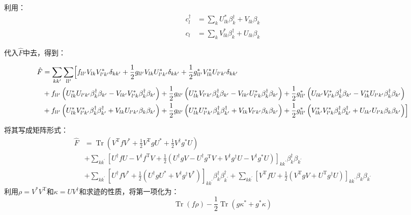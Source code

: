 \begin{booknote*}
利用：
\begin{align*}
c^{\dagger}_{l} & =\sum_{k}U^{*}_{lk}\beta^{\dagger}_{k}+V_{lk}\beta_{k}\\
c_{l} & =\sum_{k}V^{*}_{lk}\beta^{\dagger}_{k}+U_{lk}\beta_{k}
\end{align*}

代入$\hat{F}$中去，得到：

\begin{align*}
\hat{F} & =\sum_{kk^{\prime}}\sum_{ll^{\prime}}\Bigl[f_{ll^{\prime}}V_{lk}V^{*}_{l^{\prime}k^{\prime}}\delta_{kk^{\prime}}+\frac{1}{2}g_{ll^{\prime}}V_{lk}U^{*}_{l^{\prime}k^{\prime}}\delta_{kk^{\prime}}+\frac{1}{2}g^{*}_{ll^{\prime}}V^{*}_{lk}U_{l^{\prime}k^{\prime}}\delta_{kk^{\prime}}\\
 & +f_{ll^{\prime}}\left(U^{*}_{lk}U_{l^{\prime}k^{\prime}}\beta^{\dagger}_{k}\beta_{k^{\prime}}-V_{lk^{\prime}}V^{*}_{l^{\prime}k}\beta^{\dagger}_{k}\beta_{k^{\prime}}\right)+\frac{1}{2}g_{ll^{\prime}}\left(U^{*}_{lk}V_{l^{\prime}k^{\prime}}\beta^{\dagger}_{k}\beta_{k^{\prime}}-V_{lk^{\prime}}U^{*}_{l^{\prime}k}\beta^{\dagger}_{k}\beta_{k^{\prime}}\right)+\frac{1}{2}g^{*}_{ll^{\prime}}\left(U_{lk^{\prime}}V^{*}_{l^{\prime}k}\beta^{\dagger}_{k}\beta_{k^{\prime}}-V^{*}_{lk}U_{l^{\prime}k^{\prime}}\beta^{\dagger}_{k}\beta_{k^{\prime}}\right)\\
 & +f_{ll^{\prime}}\left(U^{*}_{lk}V^{*}_{l^{\prime}k^{\prime}}\beta^{\dagger}_{k}\beta^{\dagger}_{k^{\prime}}+V_{lk}U_{l^{\prime}k^{\prime}}\beta_{k}\beta_{k^{\prime}}\right)+\frac{1}{2}g_{ll^{\prime}}\left(U^{*}_{lk}U^{*}_{l^{\prime}k^{\prime}}\beta^{\dagger}_{k}\beta^{\dagger}_{k^{\prime}}+V_{lk}V_{l^{\prime}k^{\prime}}\beta_{k}\beta_{k^{\prime}}\right)+\frac{1}{2}g^{*}_{ll^{\prime}}\left(V^{*}_{lk^{\prime}}V^{*}_{l^{\prime}k}\beta^{\dagger}_{k}\beta^{\dagger}_{k^{\prime}}+U_{lk^{\prime}}U_{l^{\prime}k}\beta_{k}\beta_{k^{\prime}}\right)\Bigr]
\end{align*}

将其写成矩阵形式：
\begin{align*}
\hat{F} & =\mathop{\text{Tr}}(V^{\mathrm{T}}fV^{*}+\frac{1}{2}V^{\mathrm{T}}gU^{*}+\frac{1}{2}V^{\dagger}g^{*}U)\\
 & +\sum_{kk^{\prime}}[U^{\dagger}fU-V^{\dagger}f^{\mathrm{T}}V+\frac{1}{2}(U^{\dagger}gV-U^{\dagger}g^{\mathrm{T}}V+V^{\dagger}g^{\dagger}U-V^{\dagger}g^{*}U)]_{kk^{\prime}}\beta^{\dagger}_{k}\beta_{k^{\prime}}\\
 & +\sum_{kk^{\prime}}[U^{\dagger}fV^{*}+\frac{1}{2}(U^{\dagger}gU^{*}+V^{\dagger}g^{\dagger}V^{*})]_{kk^{\prime}}\beta^{\dagger}_{k}\beta^{\dagger}_{k^{\prime}}+\sum_{kk^{\prime}}[V^{\mathrm{T}}fU+\frac{1}{2}(V^{\mathrm{T}}gV+U^{\mathrm{T}}g^{\dagger}U)]_{kk^{\prime}}\beta_{k}\beta_{k^{\prime}}
\end{align*}
利用$\rho=V^{*}V^{\mathrm{T}}$和$\kappa=UV^{\dagger}$和求迹的性质，将第一项化为：
\[
\mathop{\text{Tr}}(f\rho)-\frac{1}{2}\mathop{\text{Tr}}(g\kappa^{*}+g^{*}\kappa)
\]


\end{booknote*}
